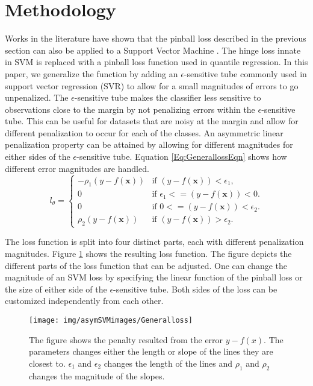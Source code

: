 \documentclass[twoside,11pt]{article}
\begin{document}
\section{Methodology}\label{generalform}
Works in the literature have shown that the pinball loss described in the previous section can also be applied to a Support Vector Machine \citep{Quadrianto09}. The hinge loss innate in SVM is replaced with a pinball loss function used in quantile regression. In this paper, we generalize the function by adding an $\epsilon$-sensitive tube commonly used in support vector regression (SVR) to allow for a small magnitudes of errors to go unpenalized. The $\epsilon$-sensitive tube makes the classifier less sensitive to observations close to the margin by not penalizing errors within the $\epsilon$-sensitive tube. This can be useful for datasets that are noisy at the margin and allow for different penalization to occur for each of the classes. An asymmetric linear penalization property can be attained by allowing for different magnitudes for either sides of the $\epsilon$-sensitive tube. Equation \ref{Eq:GenerallossEqn} shows how different error magnitudes are handled.
\begin{equation}\label{Eq:GenerallossEqn}
l_{\theta}=\begin{cases} 
	-\rho_1(y-f(\mathbf{x})) & \text{if $(y-f(\mathbf{x}))< \epsilon_1$,} \\
 0  &\text{if $\epsilon_1<=(y-f(\mathbf{x}))< 0$.} \\
 0  &\text{if $0<=(y-f(\mathbf{x}))< \epsilon_2$.} \\
 \rho_2(y-f(\mathbf{x})) &\text{if $(y-f(\mathbf{x}))>\epsilon_2$.}
\end{cases}
\end{equation}

The loss function is split into four distinct parts, each with different penalization magnitudes. Figure \ref{Fig:General Loss} shows the resulting loss function. The figure depicts the different parts of the loss function that can be adjusted. One can change the magnitude of an SVM loss by specifying the linear function of the pinball loss or the size of either side of the $\epsilon$-sensitive tube. Both sides of the loss can be customized independently from each other.
\begin{figure}
 \centering
\texttt{[image: img/asymSVMimages/Generalloss]}\\
 \caption{The figure shows the penalty resulted from the error $y-f(x)$. The parameters changes either the length or slope of the lines they are closest to. $\epsilon_1$ and $\epsilon_2$ changes the length of the lines and $\rho_1$ and $\rho_2$ changes the magnitude of the slopes.}
 \label{Fig:General Loss}
\end{figure}
\end{document}

